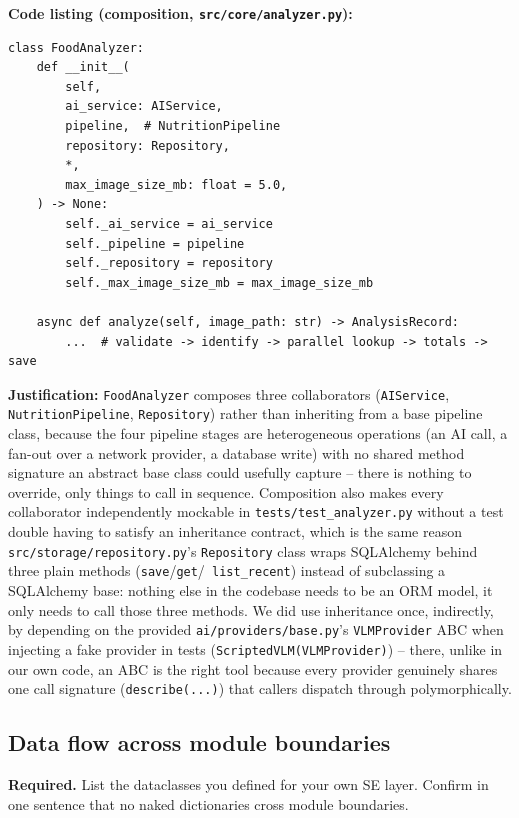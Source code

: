 \documentclass[11pt,a4paper]{article}
\newenvironment{deliverbox}{\begin{deliverboxshown}}{\end{deliverboxshown}}
\newenvironment{deliverbox}{\setbox0\vbox\bgroup}{\egroup\ignorespacesafterend}
\begin{document}
\textbf{Code listing (composition, \texttt{src/core/analyzer.py}):}
\begin{lstlisting}[style=python]
class FoodAnalyzer:
    def __init__(
        self,
        ai_service: AIService,
        pipeline,  # NutritionPipeline
        repository: Repository,
        *,
        max_image_size_mb: float = 5.0,
    ) -> None:
        self._ai_service = ai_service
        self._pipeline = pipeline
        self._repository = repository
        self._max_image_size_mb = max_image_size_mb

    async def analyze(self, image_path: str) -> AnalysisRecord:
        ...  # validate -> identify -> parallel lookup -> totals -> save
\end{lstlisting}

\textbf{Justification:} \texttt{FoodAnalyzer} composes three collaborators
(\texttt{AIService}, \texttt{NutritionPipeline}, \texttt{Repository}) rather
than inheriting from a base pipeline class, because the four pipeline stages
are heterogeneous operations (an AI call, a fan-out over a network provider,
a database write) with no shared method signature an abstract base class
could usefully capture -- there is nothing to override, only things to
call in sequence. Composition also makes every collaborator independently
mockable in \texttt{tests/test\_analyzer.py} without a test double having to
satisfy an inheritance contract, which is the same reason
\texttt{src/storage/repository.py}'s \texttt{Repository} class wraps
SQLAlchemy behind three plain methods (\texttt{save}/\texttt{get}/\texttt{
list\_recent}) instead of subclassing a SQLAlchemy base: nothing else in the
codebase needs to be an ORM model, it only needs to call those three
methods. We did use inheritance once, indirectly, by depending on the
provided \texttt{ai/providers/base.py}'s \texttt{VLMProvider} ABC when
injecting a fake provider in tests (\texttt{ScriptedVLM(VLMProvider)}) --
there, unlike in our own code, an ABC is the right tool because every
provider genuinely shares one call signature (\texttt{describe(...)}) that
callers dispatch through polymorphically.

\subsection{Data flow across module boundaries}

\begin{deliverbox}
\textbf{Required.} List the dataclasses you defined for your own SE layer. Confirm in one sentence that no naked dictionaries cross module boundaries.
\end{deliverbox}
\end{document}
